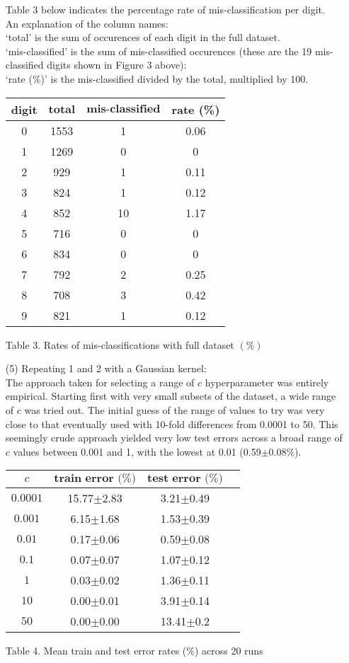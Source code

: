 \documentclass[a4paper,12pt]{article}
\begin{document}
\begin{enumerate}
Table 3 below indicates the percentage rate of mis-classification per digit. \\An explanation of the column names:\\
`total' is the sum of occurences of each digit in the full dataset. \\
`mis-classified' is the sum of mis-classified occurences (these are the 19 mis-classified digits shown in Figure 3 above):\\
`rate (\%)' is the mis-classified divided by the total, multiplied by 100. 

\begin{tabular}{|c|c|c|c|}
\hline
\textbf{digit}&$\textbf{total}$&$\textbf{mis-classified}$&\textbf{rate} (\%)\\
\hline
0&1553&1&0.06\\
\hline
1&1269&0&0\\
\hline
2&929&1&0.11\\
\hline
3&824&1&0.12\\
\hline
4&852&10&1.17\\
\hline
5&716&0&0\\
\hline
6&834&0&0\\
\hline
7&792&2&0.25\\
\hline
8&708&3&0.42\\
\hline
9&821&1&0.12\\
\hline
\end{tabular}\par 
Table 3. Rates of mis-classifications with full dataset $(\%)$

\item[(5)] Repeating 1 and 2 with a Gaussian kernel: \\The approach taken for selecting a range of $c$ hyperparameter was entirely empirical. Starting first with very small subsets of the dataset, a wide range of $c$ was tried out. The initial guess of the range of values to try was very close to that eventually used with 10-fold differences from 0.0001 to 50. This seemingly crude approach yielded very low test errors across a broad range of $c$ values between 0.001 and 1, with the lowest at 0.01 (0.59$\pm$0.08\%).\\

\begin{tabular}{|c|c|c|c|}
\hline
$c$&$\textbf{train error (\%)}$&$\textbf{test error (\%)}$\\
\hline
$0.0001$&15.77$\pm$2.83&3.21$\pm$0.49\\
\hline
$0.001$&6.15$\pm$1.68&1.53$\pm$0.39\\
\hline
$0.01$&0.17$\pm$0.06&0.59$\pm$0.08\\
\hline
$0.1$&0.07$\pm$0.07&1.07$\pm$0.12\\
\hline
$1$&0.03$\pm$0.02&1.36$\pm$0.11\\
\hline
$10$&0.00$\pm$0.01&3.91$\pm$0.14\\
\hline
$50$&0.00$\pm$0.00&13.41$\pm$0.2\\
\hline
\end{tabular}\par 
Table 4. Mean train and test error rates (\%) across 20 runs


\end{enumerate}
\end{document}
